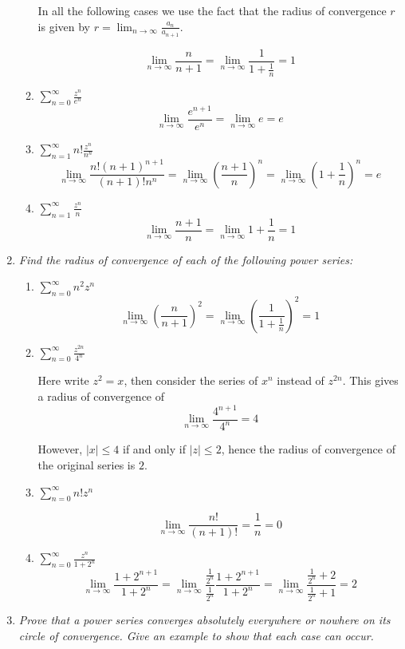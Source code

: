 \documentclass[letterpaper, 11pt]{article}
\begin{document}
\begin{enumerate}
\begin{enumerate}
In all the following cases we use the fact that the radius of convergence $r$ is given by $r = \lim_{n \rightarrow \infty} \frac{a_n}{a_{n+1}}$.

\[
\lim_{n\rightarrow\infty} \frac{n}{n+1} = \lim_{n \rightarrow \infty} \frac{1}{1 + \frac{1}{n}} = 1
\]
\item \emph{$\sum_{n=0}^\infty \frac{z^n}{e^n}$}
\[
\lim_{n \rightarrow \infty} \frac{e^{n+1}}{e^n} = \lim_{n \rightarrow \infty} e = e
\]
\item \emph{$\sum_{n=1}^\infty n! \frac{z^n}{n^n}$}
\[
\lim_{n \rightarrow \infty} \frac{n! (n+1)^{n+1}}{(n+1)! n^n} = \lim_{n \rightarrow \infty} \left(\frac{n+1}{n}\right)^n = \lim_{n \rightarrow \infty} \left(1 + \frac{1}{n}\right)^n = e
\]
\item \emph{$\sum_{n=1}^\infty \frac{z^n}{n}$}
\[
\lim_{n \rightarrow \infty} \frac{n+1}{n} = \lim_{n \rightarrow \infty} 1 + \frac{1}{n} = 1
\]
\end{enumerate}
\newpage
\item \emph{Find the radius of convergence of each of the following power series:}
\begin{enumerate}
\item \emph{$\sum_{n=0}^\infty n^2 z^n$}
\[
\lim_{n \rightarrow \infty} \left(\frac{n}{n+1}\right)^2 = \lim_{n \rightarrow \infty} \left(\frac{1}{1 + \frac{1}{n}}\right)^2 = 1
\]
\item \emph{$\sum_{n=0}^\infty \frac{z^{2n}}{4^n}$}

Here write $z^2 = x$, then consider the series of $x^n$ instead of $z^{2n}$.  This gives a radius of convergence of
\[
\lim_{n \rightarrow \infty} \frac{4^{n+1}}{4^n} = 4
\]

However, $|x| \leq 4$ if and only if $|z| \leq 2$, hence the radius of convergence of the original series is $2$.
\item \emph{$\sum_{n=0}^\infty n! z^n$}

\[
\lim_{n \rightarrow \infty} \frac{n!}{(n+1)!} = \frac{1}{n} = 0
\]

\item \emph{$\sum_{n=0}^\infty \frac{z^n}{1+2^n}$}
\[
\lim_{n \rightarrow \infty} \frac{1+2^{n+1}}{1+2^n} = \lim_{n \rightarrow \infty} \frac{\frac{1}{2^n}}{\frac{1}{2^n}} \frac{1+2^{n+1}}{1+2^n} = \lim_{n \rightarrow \infty} \frac{\frac{1}{2^n} + 2}{\frac{1}{2^n} + 1} = 2
\]

\end{enumerate}

\item \emph{Prove that a power series converges absolutely everywhere or nowhere on its circle of convergence.  Give an example to show that each case can occur.}


\end{enumerate}
\end{document}
